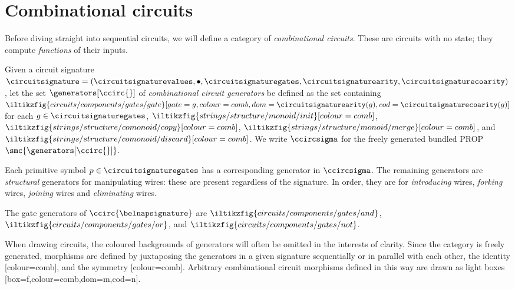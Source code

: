\section{Combinational circuits}

Before diving straight into sequential circuits, we will define a category of
\emph{combinational circuits}.
These are circuits with no state; they compute \emph{functions} of their inputs.

\begin{definition}
    Given a circuit signature \(
        \circuitsignature = (
            \circuitsignaturevalues,
            \bullet,
            \circuitsignaturegates,
            \circuitsignaturearity,
            \circuitsignaturecoarity
        )
    \), let the set \(\generators[\ccirc{}]\) of
    \emph{combinational circuit generators} be defined as the set containing \(
        \iltikzfig{circuits/components/gates/gate}[gate=g,colour=comb,dom=\circuitsignaturearity(g),cod=\circuitsignaturecoarity(g)]
    \) for each \(g \in \circuitsignaturegates\),
    \(\iltikzfig{strings/structure/monoid/init}[colour=comb]\),
    \(\iltikzfig{strings/structure/comonoid/copy}[colour=comb]\),
    \(\iltikzfig{strings/structure/monoid/merge}[colour=comb]\), and
    \(\iltikzfig{strings/structure/comonoid/discard}[colour=comb]\).
    We write \(\ccircsigma\) for the freely generated bundled PROP
    \(\smc{\generators[\ccirc{}]}\).
\end{definition}

Each primitive symbol \(p \in \circuitsignaturegates\) has a corresponding
generator in \(\ccircsigma\).
The remaining generators are \emph{structural} generators for manipulating
wires: these are present regardless of the signature.
In order, they are for \emph{introducing} wires, \emph{forking}
wires, \emph{joining} wires and \emph{eliminating} wires.

\begin{example}
    The gate generators of \(\ccirc{\belnapsignature}\) are \(
        \iltikzfig{circuits/components/gates/and}
    \), \(
        \iltikzfig{circuits/components/gates/or}
    \), and \(
        \iltikzfig{circuits/components/gates/not}
    \).
\end{example}

When drawing circuits, the coloured backgrounds of generators will often be
omitted in the interests of clarity.
Since the category is freely generated, morphisms are defined by
juxtaposing the generators in a given signature sequentially or in parallel with
each other, the identity [colour=comb], and
the symmetry [colour=comb].
Arbitrary combinational circuit morphisms defined in this way are drawn as light
boxes [box=f,colour=comb,dom=m,cod=n].

